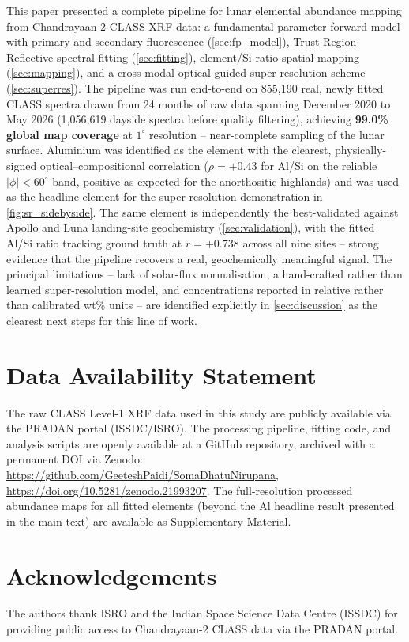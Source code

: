 \documentclass[journal,lettersize]{IEEEtran}
\begin{document}
This paper presented a complete pipeline for lunar elemental abundance
mapping from Chandrayaan-2 CLASS XRF data: a fundamental-parameter
forward model with primary and secondary fluorescence
(\cref{sec:fp_model}), Trust-Region-Reflective spectral fitting
(\cref{sec:fitting}), element/Si ratio spatial mapping
(\cref{sec:mapping}), and a cross-modal optical-guided super-resolution
scheme (\cref{sec:superres}). The pipeline was run end-to-end on
855{,}190 real, newly fitted CLASS spectra drawn from 24 months of raw
data spanning December 2020 to May 2026 (1{,}056{,}619 dayside spectra
before quality filtering), achieving \textbf{99.0\% global map coverage}
at $1^{\circ}$ resolution -- near-complete sampling of the lunar surface.
Aluminium was identified as the element with the clearest, physically-signed
optical--compositional correlation ($\rho=+0.43$ for Al/Si on the reliable
$|\phi|<60^{\circ}$ band, positive as expected for the anorthositic
highlands) and was used as the headline element for the super-resolution
demonstration in \cref{fig:sr_sidebyside}. The same element is
independently the best-validated against Apollo and Luna landing-site
geochemistry (\cref{sec:validation}), with the fitted Al/Si ratio tracking
ground truth at $r=+0.738$ across all nine sites -- strong evidence that
the pipeline recovers a real, geochemically meaningful signal. The
principal limitations --
lack of solar-flux normalisation, a hand-crafted rather than learned
super-resolution model, and concentrations reported in relative rather
than calibrated wt\% units -- are identified explicitly in
\cref{sec:discussion} as the clearest next steps for this line of work.

\section*{Data Availability Statement}
The raw CLASS Level-1 XRF data used in this study are publicly available
via the PRADAN portal (ISSDC/ISRO). The processing pipeline, fitting
code, and analysis scripts are openly available at a GitHub repository,
archived with a permanent DOI via Zenodo: \url{https://github.com/GeeteshPaidi/SomaDhatuNirupana}, \url{https://doi.org/10.5281/zenodo.21993207}. The full-resolution
processed abundance maps for all fitted elements (beyond the Al headline
result presented in the main text) are available as Supplementary
Material.

\section*{Acknowledgements}
The authors thank ISRO and the Indian Space Science Data Centre (ISSDC)
for providing public access to Chandrayaan-2 CLASS data via the PRADAN
portal.
\end{document}
